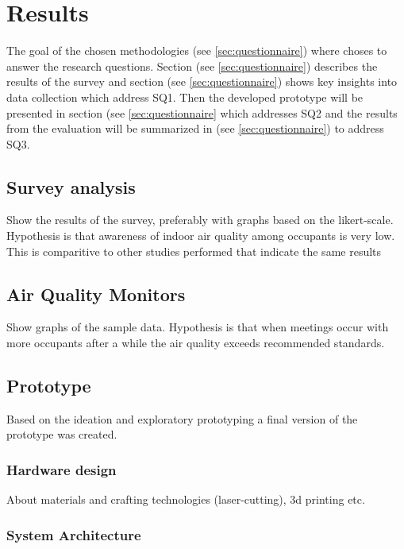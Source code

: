 \section{Results}
\label{sec:results}

The goal of the chosen methodologies (see \ref{sec:questionnaire}) where choses to answer the research questions. Section (see \ref{sec:questionnaire}) describes the results of the survey and section (see \ref{sec:questionnaire}) shows key insights into data collection which address SQ1. Then the developed prototype will be presented in section (see \ref{sec:questionnaire} which addresses SQ2 and the results from the evaluation will be summarized in (see \ref{sec:questionnaire}) to address SQ3.

\subsection{Survey analysis}
Show the results of the survey, preferably with graphs based on the likert-scale. Hypothesis is that awareness of indoor air quality among occupants is very low. This is comparitive to other studies performed that indicate the same results 

\subsection{Air Quality Monitors}

Show graphs of the sample data. Hypothesis is that when meetings occur with more occupants after a while the air quality exceeds recommended standards.

\subsection{Prototype}

Based on the ideation and exploratory prototyping a final version of the prototype was created.

\subsubsection{Hardware design}

About materials and crafting technologies (laser-cutting), 3d printing etc.

\subsubsection{System Architecture}

